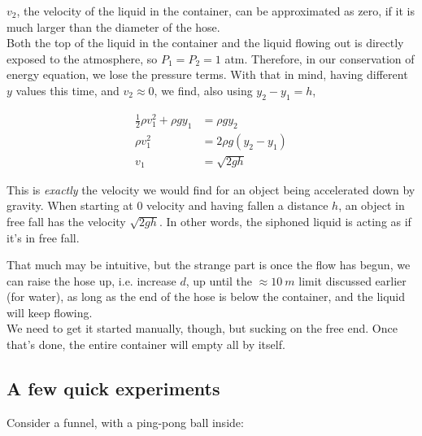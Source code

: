 $v_2$, the velocity of the liquid in the container, can be approximated as zero, if it is much larger than the diameter of the hose.\\
Both the top of the liquid in the container and the liquid flowing out is directly exposed to the atmosphere, so $P_1 = P_2 = 1$ atm. Therefore, in our conservation of energy equation, we lose the pressure terms. With that in mind, having different $y$ values this time, and $v_2 \approx 0$, we find, also using $y_2 - y_1 = h$,

\begin{align}
\frac{1}{2} \rho v_1^2 + \rho g y_1 &= \rho g y_2\\
\rho v_1^2 &= 2 \rho g (y_2 - y_1)\\
v_1 &= \sqrt{2 g h}
\end{align}

This is \emph{exactly} the velocity we would find for an object being accelerated down by gravity. When starting at 0 velocity and having fallen a distance $h$, an object in free fall has the velocity $\sqrt{2 g h}$. In other words, the siphoned liquid is acting as if it's in free fall.

That much may be intuitive, but the strange part is once the flow has begun, we can raise the hose up, i.e. increase $d$, up until the $\approx \SI{10}{m}$ limit discussed earlier (for water), as long as the end of the hose is below the container, and the liquid will keep flowing.\\
We need to get it started manually, though, but sucking on the free end. Once that's done, the entire container will empty all by itself.

\subsection{A few quick experiments}

Consider a funnel, with a ping-pong ball inside:

\begin{figure}[H]
\centering
{}
\end{figure}


